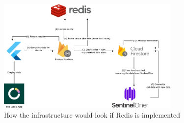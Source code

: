 \begin{figure}[htbp]
  \centering
  \includegraphics[width=0.8\textwidth]{Figures/Redis Caching.jpg}
  \caption{How the infrastructure would look if Redis is implemented}
\end{figure}